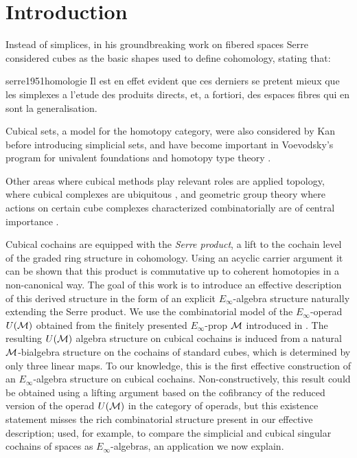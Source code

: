
\section{Introduction} \label{s:introduction}

Instead of simplices, in his groundbreaking work on fibered spaces Serre considered cubes as the basic shapes used to define cohomology, stating that:

\begin{displaycquote}[p.431]{serre1951homologie}
	Il est en effet evident que ces derniers se pretent mieux que les simplexes a l'etude des produits directs, et, a fortiori, des espaces fibres qui en sont la generalisation.
\end{displaycquote}

Cubical sets, a model for the homotopy category, were also considered by Kan \cite{kan1955abstract, kan1956abstract} before introducing simplicial sets, and have become important in Voevodsky's program for univalent foundations and homotopy type theory \cite{kapulkin2020straightening, mortberg2017cubical}.

Other areas where cubical methods play relevant roles are applied topology, where cubical complexes are ubiquitous \cite{tomasz2004computational}, and geometric group theory where actions on certain cube complexes characterized combinatorially are of central importance \cite{gromov1987hyperbolic, agol2013haken}.

Cubical cochains are equipped with the \textit{Serre product}, a lift to the cochain level of the graded ring structure in cohomology.
Using an acyclic carrier argument it can be shown that this product is commutative up to coherent homotopies in a non-canonical way.
The goal of this work is to introduce an effective description of this derived structure in the form of an explicit $E_\infty$-algebra structure naturally extending the Serre product.
We use the combinatorial model of the $E_\infty$-operad $U(\mathcal{M})$ obtained from the finitely presented $E_\infty$-prop $\mathcal{M}$ introduced in \cite{medina2020prop1}.
The resulting $U(\mathcal{M})$ algebra structure on cubical cochains is induced from a natural $\mathcal{M}$-bialgebra structure on the cochains of standard cubes, which is determined by only three linear maps.
To our knowledge, this is the first effective construction of an $E_\infty$-algebra structure on cubical cochains.
Non-constructively, this result could be obtained using a lifting argument based on the cofibrancy of the reduced version of the operad $U(\mathcal{M})$ in the category of operads, but this existence statement misses the rich combinatorial structure present in our effective description; used, for example, to compare the simplicial and cubical singular cochains of spaces as $E_\infty$-algebras, an application we now explain.

